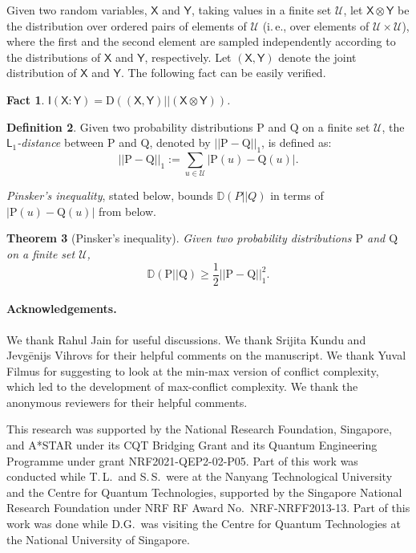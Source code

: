 \documentclass[11pt]{article}
\numberwithin{equation}{section}
\newtheorem{theorem}{Theorem}[section]
\newtheorem{fact}[theorem]{Fact}
\theoremstyle{definition}
\newtheorem{definition}[theorem]{Definition}
\theoremstyle{plain}
\newcommand{\ie}{i.\,e.}
\newcommand{\D}{\mathbb{D}}
\newcommand{\Div}{\text{D}}
\newcommand{\clU}{\mathcal{U}}
\newcommand{\X}{\mathsf{X}}
\newcommand{\Y}{\mathsf{Y}}
\newcommand{\I}{\mathsf{I}}
\newcommand{\ccc}{max-conflict complexity}
\begin{document}
Given two random variables, $\X$ and $\Y$, taking values in a finite set $\clU$,
%
let  %
$\X \otimes \Y$ be
the  %
distribution over ordered pairs of elements of $\clU$ (\ie, over elements of $\clU \times \clU$), where the %
first and the second element  %
are sampled independently according to
the  %
distributions of $\X$ and $\Y$, respectively. Let $(\X,\Y)$ denote the joint distribution of $\X$ and $\Y$. The following fact can be easily verified.
\begin{fact}
\label{equivalence}
$\I(\X:\Y)=\Div((\X,\Y) || (\X \otimes \Y))$.
\end{fact}
\begin{definition}
\label{l1n}
Given two probability distributions $\text{P}$ and $\text{Q}$ on a finite set $\clU$, the \emph{$\mathsf{L}_1$-distance} between $\text{P}$ and $\text{Q}$, denoted by $||\text{P}-\text{Q}||_1$, is defined as:
\[||\text{P}-\text{Q}||_1:=\sum_{u \in \clU}|\text{P}(u)-\text{Q}(u)|.\]
\end{definition}
\emph{Pinsker's inequality}, stated below, bounds $\D(P || Q)$ in terms of $|\text{P}(u)-\text{Q}(u)|$ from below.
\begin{theorem}[Pinsker's inequality]
\label{pinskers}
Given two probability distributions $\text{P}$ and $\text{Q}$ on a finite set $\clU$,
\[\D(\text{P} || \text{Q}) \geq \frac{1}{2} ||\text{P}-\text{Q}||^2_1.\]
\end{theorem}


\paragraph*{Acknowledgements.} We thank Rahul Jain for useful discussions. We thank Srijita Kundu and Jevg\={e}nijs Vihrovs for their helpful comments on the manuscript.  We thank Yuval Filmus for 
suggesting to look at the min-max version of conflict complexity, which led to the development of \ccc. We thank the anonymous reviewers for their helpful comments.

%
This research was supported by the National Research Foundation, Singapore, and A*STAR under its CQT Bridging Grant and its Quantum Engineering Programme under grant NRF2021-QEP2-02-P05.
%
Part of this work was conducted while T.\,L.\ and S.\,S.\ were at the Nanyang Technological University and the Centre for Quantum Technologies, supported by the Singapore National Research Foundation under NRF RF Award No.\ 
NRF-NRFF2013-13. Part of this work was done while D.G.\ was visiting the Centre for Quantum Technologies at the National University of Singapore.
\end{document}
